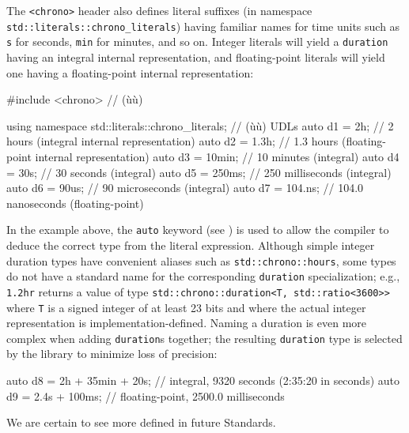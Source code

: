 The \lstinline!<chrono>! header also defines literal suffixes (in namespace\linebreak%
\lstinline!std::literals::chrono_literals!) having familiar names for time
units such as \lstinline!s! for seconds, \lstinline!min! for minutes, and so
on. Integer literals will yield a \lstinline!duration! having an integral
internal representation, and floating-point literals will yield one
having a floating-point internal representation:

\begin{emcppslisting}[emcppsbatch=e13,emcppsstandards=c++14]
#include <chrono>  // (ù{}ù)

using namespace std::literals::chrono_literals;  // (ù{}ù) UDLs
auto d1 = 2h;      // 2 hours   (integral internal representation)
auto d2 = 1.3h;    // 1.3 hours (floating-point internal representation)
auto d3 = 10min;   // 10 minutes (integral)
auto d4 = 30s;     // 30 seconds (integral)
auto d5 = 250ms;   // 250 milliseconds (integral)
auto d6 = 90us;    // 90 microseconds (integral)
auto d7 = 104.ns;  // 104.0 nanoseconds (floating-point)
\end{emcppslisting}
    
\noindent In the example above, the \lstinline!auto! keyword (see ) is used to allow the compiler to deduce
the correct type from the literal expression. Although simple integer
duration types have convenient aliases such as
\lstinline!std::chrono::hours!, some types do not have a standard name for
the corresponding \lstinline!duration! specialization; e.g., \lstinline!1.2hr!
returns a value of type
\lstinline!std::chrono::duration<T, std::ratio<3600>>! where \lstinline!T! is a signed integer of at least 23 bits and 
where the actual integer representation is implementation-defined.
Naming a duration is even more complex when adding \lstinline!duration!s
together; the resulting \lstinline!duration! type is selected by the
library to minimize loss of precision:

\begin{emcppslisting}[emcppsbatch=e13]
auto d8 = 2h + 35min + 20s;  // integral, 9320 seconds (2:35:20 in seconds)
auto d9 = 2.4s + 100ms;       // floating-point, 2500.0 milliseconds
\end{emcppslisting}
    
\noindent We are certain to see more  defined in future
Standards.

